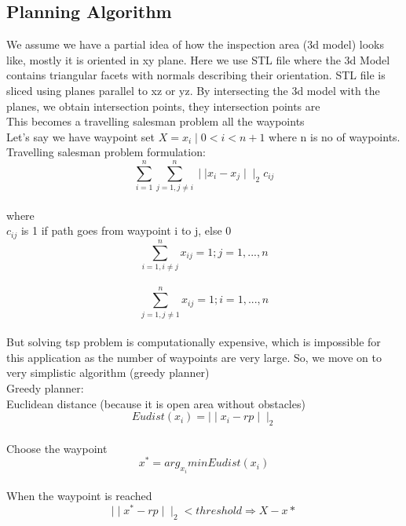 \documentclass[conference]{IEEEtran}
\begin{document}
\subsection{Planning Algorithm}
We assume we have a partial idea of how the inspection area (3d model) looks like, mostly it is oriented in xy plane. Here we use STL file where the 3d Model contains triangular facets with normals describing their orientation. 
STL file is sliced using planes parallel to xz or yz. By intersecting the 3d  model with the planes, we obtain intersection points, they intersection points are\\ 
This becomes a travelling salesman problem all the waypoints \\
Let’s say we have waypoint set $X={x_i \mid 0<i<n+1}$ where n is no of waypoints. \\
Travelling salesman problem formulation:\\
\begin{equation} \label{eq:8}
\sum_{i=1}^{n}\sum_{j=1,j\neq i}^{n}\mid\mid x_i-x_j\mid\mid_2c_{ij}
\end{equation}\\
where\\
$c_{ij}$ is 1 if path goes from waypoint i to j, else 0
\begin{equation} \label{eq:8}
\sum_{i=1,i\neq j}^{n}x_{ij}=1; j=1,...,n
\end{equation}\\
\begin{equation} \label{eq:8}
\sum_{j=1,j\neq 1}^{n}x_{ij}=1; i=1,...,n
\end{equation}\\
But solving tsp problem is computationally expensive, which is impossible for this application as the number of waypoints are very large. So, we move on to very simplistic algorithm (greedy planner) \\
Greedy planner:\\
Euclidean distance (because it is open area without obstacles)\\
\begin{equation} \label{eq:8}
Eudist(x_i)=\mid\mid x_i-rp\mid\mid_2
\end{equation}\\
Choose the waypoint 
\begin{equation} \label{eq:8}
x^*=arg_{x_i}min{Eudist(x_i)}
\end{equation}\\
When the waypoint is reached 
\begin{equation} \label{eq:8}
\mid\mid x^*-rp\mid\mid_2 < threshold \Rightarrow X-{x*}
\end{equation}\\
\end{document}
